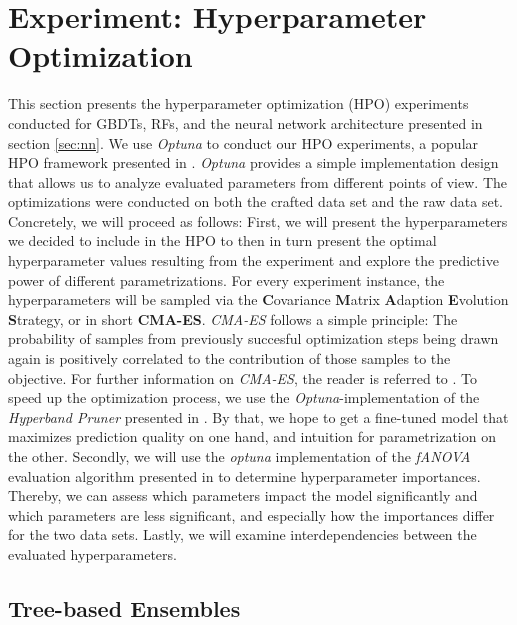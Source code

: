 \section{Experiment: Hyperparameter Optimization}
This section presents the hyperparameter optimization (HPO) experiments conducted for GBDTs, RFs, and the neural network architecture presented in section \ref{sec:nn}. 
We use \textit{Optuna} to conduct our HPO experiments, a popular HPO framework presented in \cite{akiba2019optuna}. 
\textit{Optuna} provides a simple implementation design that allows us to analyze evaluated parameters from different points of view. 
The optimizations were conducted on both the crafted data set and the raw data set. 
Concretely, we will proceed as follows: First, we will present the hyperparameters we decided to include in the HPO to then in turn present the optimal hyperparameter values resulting from the experiment and explore the predictive power of different parametrizations. 
For every experiment instance, the hyperparameters will be sampled via the \textbf{C}ovariance \textbf{M}atrix \textbf{A}daption \textbf{E}volution \textbf{S}trategy, or in short \textbf{CMA-ES}. \textit{CMA-ES} follows a simple principle: The probability of samples from previously succesful optimization steps being drawn again is positively correlated to the contribution of those samples to the objective. For further information on \textit{CMA-ES}, the reader is referred to \cite{hansen2016cma}. To speed up the optimization process, we use the \textit{Optuna}-implementation of the \textit{Hyperband Pruner} presented in \cite{li2018hyperband}. 
By that, we hope to get a fine-tuned model that maximizes prediction quality on one hand, and intuition for parametrization on the other.
Secondly, we will use the \textit{optuna} implementation of the \textit{fANOVA} evaluation algorithm presented in \cite{fANOVA} to determine hyperparameter importances. 
Thereby, we can assess which parameters impact the model significantly and which parameters are less significant, and especially how the importances differ for the two data sets. 
Lastly, we will examine interdependencies between the evaluated hyperparameters. 
 
\subsection{Tree-based Ensembles}


